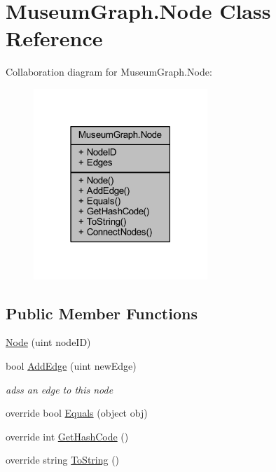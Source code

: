 \hypertarget{class_museum_graph_1_1_node}{}\section{Museum\+Graph.\+Node Class Reference}
\label{class_museum_graph_1_1_node}


Collaboration diagram for Museum\+Graph.\+Node\+:
\nopagebreak
\begin{figure}[H]
\begin{center}
\leavevmode
\includegraphics[width=186pt]{class_museum_graph_1_1_node__coll__graph}
\end{center}
\end{figure}
\subsection*{Public Member Functions}
\begin{DoxyCompactItemize}
\item 
\mbox{\hyperlink{class_museum_graph_1_1_node_a917a203c77b5aa5e65c7293ba896d2c1}{Node}} (uint node\+ID)
\item 
bool \mbox{\hyperlink{class_museum_graph_1_1_node_adecbc3b471d15c5480d4c13e9502ac27}{Add\+Edge}} (uint new\+Edge)
\begin{DoxyCompactList}\small\item\em adss an edge to this node \end{DoxyCompactList}\item 
override bool \mbox{\hyperlink{class_museum_graph_1_1_node_a341a560512b816a8af059813480ef9da}{Equals}} (object obj)
\item 
override int \mbox{\hyperlink{class_museum_graph_1_1_node_adcc32750b64d61121c1431ffc41b0f8d}{Get\+Hash\+Code}} ()
\item 
override string \mbox{\hyperlink{class_museum_graph_1_1_node_a3bfacc4d5a119f353c81b197ad6a4642}{To\+String}} ()
\end{DoxyCompactItemize}
